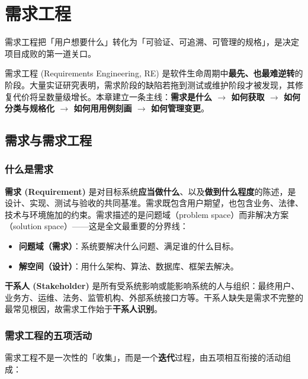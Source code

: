 \clearpage
\begingroup
\let\clearpage\relax
\let\cleardoublepage\relax
\vspace*{\fill}
\chapter{需求工程}
\begin{center}
需求工程把「用户想要什么」转化为「可验证、可追溯、可管理的规格」，是决定项目成败的第一道关口。
\end{center}
\vspace*{\fill}
\endgroup
\clearpage

需求工程 (Requirements Engineering, RE) 是软件生命周期中\textbf{最先、也最难逆转}的阶段。大量实证研究表明，需求阶段的缺陷若拖到测试或维护阶段才被发现，其修复代价将呈数量级增长。本章建立一条主线：\textbf{需求是什么 $\to$ 如何获取 $\to$ 如何分类与规格化 $\to$ 如何用用例刻画 $\to$ 如何管理变更}。

\section{需求与需求工程}

\subsection{什么是需求}

\textbf{需求 (Requirement)} 是对目标系统\textbf{应当做什么}、以及\textbf{做到什么程度}的陈述，是设计、实现、测试与验收的共同基准。需求既包含用户期望，也包含业务、法律、技术与环境施加的约束。需求描述的是问题域（problem space）而非解决方案（solution space）——这是全文最重要的分界线：

\begin{itemize}
    \item \textbf{问题域（需求）}：系统要解决什么问题、满足谁的什么目标。
    \item \textbf{解空间（设计）}：用什么架构、算法、数据库、框架去解决。
\end{itemize}

\textbf{干系人 (Stakeholder)} 是所有受系统影响或能影响系统的人与组织：最终用户、业务方、运维、法务、监管机构、外部系统接口方等。干系人缺失是需求不完整的最常见根因，故需求工作始于\textbf{干系人识别}。

\subsection{需求工程的五项活动}

需求工程不是一次性的「收集」，而是一个\textbf{迭代}过程，由五项相互衔接的活动组成：

